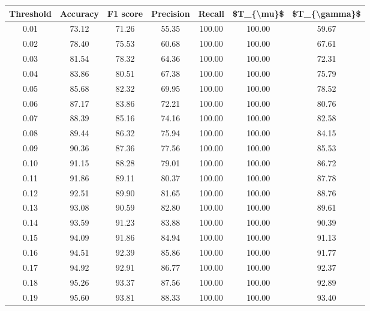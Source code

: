 \begin{tabular}{|c|c|c|c|c|c|c|}
\hline
 Threshold &  Accuracy &  F1 score &  Precision &  Recall &  \$T\_\{\textbackslash mu\}\$ &  \$T\_\{\textbackslash gamma\}\$ \\
\hline
      0.01 &     73.12 &     71.26 &      55.35 &  100.00 &     100.00 &         59.67 \\
      0.02 &     78.40 &     75.53 &      60.68 &  100.00 &     100.00 &         67.61 \\
      0.03 &     81.54 &     78.32 &      64.36 &  100.00 &     100.00 &         72.31 \\
      0.04 &     83.86 &     80.51 &      67.38 &  100.00 &     100.00 &         75.79 \\
      0.05 &     85.68 &     82.32 &      69.95 &  100.00 &     100.00 &         78.52 \\
      0.06 &     87.17 &     83.86 &      72.21 &  100.00 &     100.00 &         80.76 \\
      0.07 &     88.39 &     85.16 &      74.16 &  100.00 &     100.00 &         82.58 \\
      0.08 &     89.44 &     86.32 &      75.94 &  100.00 &     100.00 &         84.15 \\
      0.09 &     90.36 &     87.36 &      77.56 &  100.00 &     100.00 &         85.53 \\
      0.10 &     91.15 &     88.28 &      79.01 &  100.00 &     100.00 &         86.72 \\
      0.11 &     91.86 &     89.11 &      80.37 &  100.00 &     100.00 &         87.78 \\
      0.12 &     92.51 &     89.90 &      81.65 &  100.00 &     100.00 &         88.76 \\
      0.13 &     93.08 &     90.59 &      82.80 &  100.00 &     100.00 &         89.61 \\
      0.14 &     93.59 &     91.23 &      83.88 &  100.00 &     100.00 &         90.39 \\
      0.15 &     94.09 &     91.86 &      84.94 &  100.00 &     100.00 &         91.13 \\
      0.16 &     94.51 &     92.39 &      85.86 &  100.00 &     100.00 &         91.77 \\
      0.17 &     94.92 &     92.91 &      86.77 &  100.00 &     100.00 &         92.37 \\
      0.18 &     95.26 &     93.37 &      87.56 &  100.00 &     100.00 &         92.89 \\
      0.19 &     95.60 &     93.81 &      88.33 &  100.00 &     100.00 &         93.40 \\

\end{tabular}

